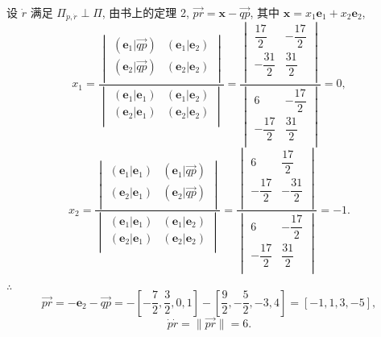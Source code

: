 \documentclass[color=black,device=normal,lang=cn,mode=geye]{elegantnote}
\begin{document}
\begin{solution}
    设 $\dot{r}$ 满足 $\varPi_{\dot{p},\dot{r}}\perp\varPi$, 由书上的定理 2, $\overrightarrow{pr}=\boldsymbol{x}-\overrightarrow{qp}$, 其中 $\boldsymbol{x}=x_1\boldsymbol{e}_1+x_2\boldsymbol{e}_2$,
    \[x_1=\dfrac{\begin{vmatrix}
        (\boldsymbol{e}_1|\overrightarrow{qp}) & (\boldsymbol{e}_1|\boldsymbol{e}_2) \\
        (\boldsymbol{e}_2|\overrightarrow{qp}) & (\boldsymbol{e}_2|\boldsymbol{e}_2) \\
    \end{vmatrix}}{\begin{vmatrix}
        (\boldsymbol{e}_1|\boldsymbol{e}_1) & (\boldsymbol{e}_1|\boldsymbol{e}_2) \\
        (\boldsymbol{e}_2|\boldsymbol{e}_1) & (\boldsymbol{e}_2|\boldsymbol{e}_2) \\
    \end{vmatrix}}=\dfrac{\begin{vmatrix}
        \dfrac{17}{2} & -\dfrac{17}{2} \\[8pt]
        -\dfrac{31}{2} & \dfrac{31}{2} \\
    \end{vmatrix}}{\begin{vmatrix}
        6 & -\dfrac{17}{2} \\[8pt]
        -\dfrac{17}{2} & \dfrac{31}{2} \\
    \end{vmatrix}}=0,\]
    \[x_2=\dfrac{\begin{vmatrix}
        (\boldsymbol{e}_1|\boldsymbol{e}_1) & (\boldsymbol{e}_1|\overrightarrow{qp}) \\
        (\boldsymbol{e}_2|\boldsymbol{e}_1) & (\boldsymbol{e}_2|\overrightarrow{qp}) \\
    \end{vmatrix}}{\begin{vmatrix}
        (\boldsymbol{e}_1|\boldsymbol{e}_1) & (\boldsymbol{e}_1|\boldsymbol{e}_2) \\
        (\boldsymbol{e}_2|\boldsymbol{e}_1) & (\boldsymbol{e}_2|\boldsymbol{e}_2) \\
    \end{vmatrix}}=\dfrac{\begin{vmatrix}
        6 & \dfrac{17}{2} \\[8pt]
        -\dfrac{17}{2} & -\dfrac{31}{2} \\
    \end{vmatrix}}{\begin{vmatrix}
        6 & -\dfrac{17}{2} \\[8pt]
        -\dfrac{17}{2} & \dfrac{31}{2} \\
    \end{vmatrix}}=-1.\]

    $\therefore$
    \[\overrightarrow{pr}=-\boldsymbol{e}_2-\overrightarrow{qp}=-\left[-\dfrac{7}{2},\dfrac{3}{2},0,1\right]-\left[\dfrac{9}{2},-\dfrac{5}{2},-3,4\right]=[-1,1,3,-5],\]
    \[\dot{p}\dot{r}=\|\overrightarrow{pr}\|=6.\]
\end{solution}
\end{document}
